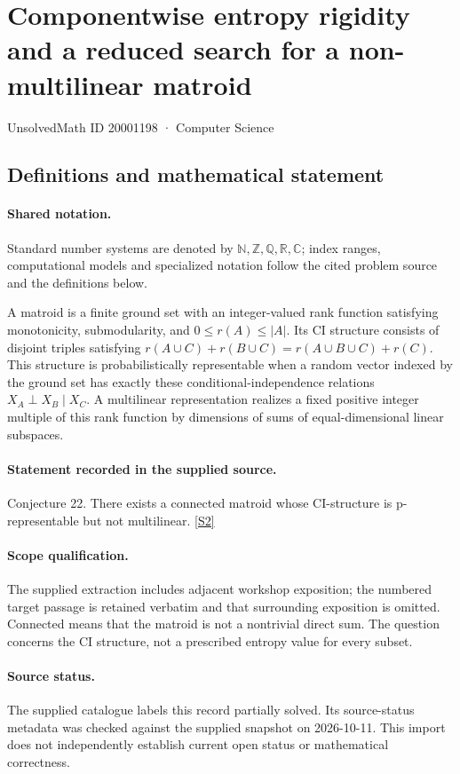 \documentclass[11pt]{article}
\newcommand{\sref}[2]{\hyperlink{source:#1:#2}{[S#2]}}
\begin{document}
\setcounter{section}{20001197}
\section{Componentwise entropy rigidity and a reduced search for a non-multilinear matroid}\label{20001198}
{\small\sffamily UnsolvedMath ID 20001198 · Computer Science}
\subsection{Definitions and mathematical statement}

\paragraph{Shared notation.}Standard number systems are denoted by $\mathbb N,\mathbb Z,\mathbb Q,\mathbb R,\mathbb C$; index ranges, computational models and specialized notation follow the cited problem source and the definitions below.


A matroid is a finite ground set with an integer-valued rank function satisfying monotonicity, submodularity, and $0\le r(A)\le |A|$. Its CI structure consists of disjoint triples satisfying $r(A\cup C)+r(B\cup C)=r(A\cup B\cup C)+r(C)$. This structure is probabilistically representable when a random vector indexed by the ground set has exactly these conditional-independence relations $X_A\perp X_B\mid X_C$. A multilinear representation realizes a fixed positive integer multiple of this rank function by dimensions of sums of equal-dimensional linear subspaces.
\paragraph{Statement recorded in the supplied source.}
Conjecture 22. There exists a connected matroid whose CI-structure is p-representable but not multilinear. \sref{20001198}{2}
\paragraph{Scope qualification.}
The supplied extraction includes adjacent workshop exposition; the numbered target passage is retained verbatim and that surrounding exposition is omitted. Connected means that the matroid is not a nontrivial direct sum. The question concerns the CI structure, not a prescribed entropy value for every subset.
\paragraph{Source status.}
The supplied catalogue labels this record partially solved. Its source-status metadata was checked against the supplied snapshot on 2026-10-11. This import does not independently establish current open status or mathematical correctness.
\end{document}
